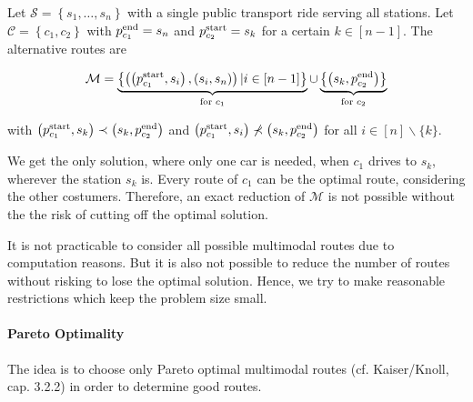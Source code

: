 \begin{example}

Let $\mathcal{S}=\left\{s_1,\dots,s_n\right\}$ with a single public transport ride serving all stations. Let $\mathcal{C}=\left\{c_1,c_2\right\}$ with $p^{\operatorname{end}}_{c_1}=s_n$ and $p^{\operatorname{start}}_{c_2}=s_k$ for a certain $k\in[n-1]$. The alternative routes are

\begin{align*}
	\mathcal{M} = \underbrace{\left\{\left(\left(p^{\operatorname{start}}_{c_1},s_i\right),\left(s_i,s_n\right)\right)|i\in[n-1]\right\}}_{\text{for }c_1}\cup\underbrace{\left\{\left(s_k,p^{\operatorname{end}}_{c_2}\right)\right\}}_{\text{for }c_2}
\end{align*}

with $\left(p^{\operatorname{start}}_{c_1},s_k\right)\prec\left(s_k,p^{\operatorname{end}}_{c_2}\right)$ and $\left(p^{\operatorname{start}}_{c_1},s_i\right)\not\prec\left(s_k,p^{\operatorname{end}}_{c_2}\right)$ for all $i\in[n]\backslash\{k\}$. 

We get the only solution, where only one car is needed, when $c_1$ drives to $s_k$, wherever the station $s_k$ is. Every route of $c_1$ can be the optimal route, considering the other costumers. Therefore, an exact reduction of $\mathcal{M}$ is not possible without the the risk of cutting off the optimal solution.
	
\end{example}

It is not practicable to consider all possible multimodal routes due to computation reasons. But it is also not possible to reduce the number of routes without risking to lose the optimal solution. Hence, we try to make reasonable restrictions which keep the problem size small.

\paragraph{Pareto Optimality} \parfill

The idea is to choose only Pareto optimal multimodal routes (cf. Kaiser/Knoll, cap. 3.2.2) in order to determine good routes.

